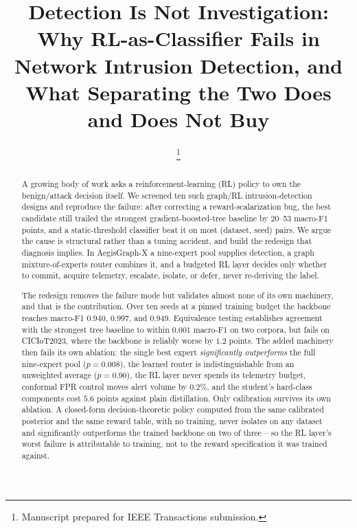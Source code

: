 \documentclass[journal]{IEEEtran}
\begin{document}
\title{Detection Is Not Investigation: Why RL-as-Classifier Fails in
Network Intrusion Detection, and What Separating the Two Does and Does
Not Buy}

\author{
\thanks{Manuscript prepared for IEEE Transactions submission.}}


\maketitle

\begin{abstract}
A growing body of work asks a reinforcement-learning (RL) policy to own the
benign/attack decision itself. We screened ten such graph/RL
intrusion-detection designs and reproduce the failure: after correcting a
reward-scalarization bug, the best candidate still trailed the strongest
gradient-boosted-tree baseline by 20--53 macro-F1 points, and a
static-threshold classifier beat it on most (dataset, seed) pairs. We argue
the cause is structural rather than a tuning accident, and build the
redesign that diagnosis implies. In AegisGraph-X a nine-expert pool supplies
detection, a graph mixture-of-experts router combines it, and a budgeted RL
layer decides only whether to commit, acquire telemetry, escalate, isolate,
or defer, never re-deriving the label.

The redesign removes the failure mode but validates almost none of its own
machinery, and that is the contribution. Over ten seeds at a pinned training
budget the backbone reaches macro-F1 $0.940$, $0.997$, and $0.949$.
Equivalence testing establishes agreement with the strongest tree baseline
to within $0.001$ macro-F1 on two corpora, but fails on CICIoT2023, where
the backbone is reliably worse by $1.2$ points. The added machinery then
fails its own ablation: the single best expert \emph{significantly
outperforms} the full nine-expert pool ($p = 0.008$), the learned router is
indistinguishable from an unweighted average ($p = 0.90$), the RL layer
never spends its telemetry budget, conformal FPR control moves alert volume
by $0.2\%$, and the student's hard-class components cost $5.6$ points
against plain distillation. Only calibration survives its own ablation. A
closed-form decision-theoretic policy computed from the same calibrated
posterior and the same reward table, with no training, never isolates on
any dataset and significantly outperforms the trained backbone on two of
three -- so the RL layer's worst failure is attributable to training, not to
the reward specification it was trained against.
\end{abstract}
\end{document}
